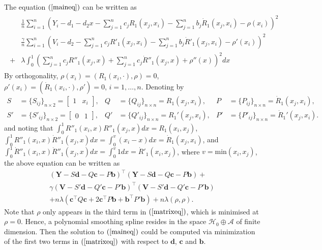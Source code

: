 The equation $(\ref{maineq})$ can be written as
\begin{align*}
\begin{split}
&\frac{1}{n}\sum_{i=1}^n \left( Y_i - d_1-d_2x-\sum_{j=1}^{n}c_jR_1(x_j,x_i)-\sum_{j=1}^{n}b_j\dot{R}_1(x_j,x_i)-\rho(x_i) \right) ^2\\
&\frac{\gamma}{n}\sum_{i=1}^n \left( V_i - d_2-\sum_{j=1}^{n}c_jR'_1(x_j,x_i)-\sum_{j=1}^{n}b_j\dot{R}'_1(x_j,x_i)-\rho'(x_i) \right) ^2\\
+&\lambda \int_0^1 \left( \sum_{j=1}^{n}c_jR''_1(x_j,x)+\sum_{j=1}^{n}c_j\dot{R}''_1(x_j,x)+\rho''(x)\right)^2dx
\end{split}
\end{align*}
By orthogonality, $\rho(x_i) = (R_1(x_i,\cdot),\rho)=0$, $\rho'(x_i) = (\dot{R}_1(x_i,\cdot),\rho')=0$, $i=1,\ldots,n$. Denoting by
\begin{align*}
S&=\{S_{ij} \}_{n\times 2}=\begin{bmatrix}1 & x_i \end{bmatrix} ,& Q&=\{Q_{ij} \}_{n\times n}= R_1(x_j,x_i), & P&=\{P_{ij} \}_{n\times n}= \dot{R}_1(x_j,x_i), \\
S'&=\{S'_{ij} \}_{n\times 2}=\begin{bmatrix} 0 & 1 \end{bmatrix} ,& Q'&=\{Q'_{ij} \}_{n\times n}= R_1'(x_j,x_i), & P'&=\{P'_{ij} \}_{n\times n}= \dot{R}_1'(x_j,x_i). 
\end{align*}
and noting that $\int_0^1R''_1(x_i,x)R''_1(x_j,x)dx=R_1(x_i,x_j)$, $\int_0^1R''_1(x_i,x)\dot{R}''_1(x_j,x)dx=\int_0^{v}(x_i-x)dx=\dot{R}_1(x_j,x_i)$, and $\int_0^1\dot{R}''_1(x_i,x)\dot{R}''_1(x_j,x)dx=\int_0^{v}1dx=\dot{R}'_1(x_i,x_j)$, where $v=\mbox{min}(x_i,x_j)$, the above equation can be written as
\begin{equation}\label{matrixeq}
\begin{split}
(\mathbf{Y}-S\mathbf{d}-Q\mathbf{c}-P\mathbf{b})^\top (\mathbf{Y}-S\mathbf{d}-Q\mathbf{c}-P\mathbf{b})+\\
\gamma(\mathbf{V}-S'\mathbf{d}-Q'\mathbf{c}-P'\mathbf{b})^\top (\mathbf{V}-S'\mathbf{d}-Q'\mathbf{c}-P'\mathbf{b})\\
+n\lambda (\mathbf{c}^\top Q\mathbf{c} + 2\mathbf{c}^\top P\mathbf{b}+ \mathbf{b}^\top P'\mathbf{b})+n\lambda(\rho,\rho).
\end{split}
\end{equation}
Note that $\rho$ only appears in the third term in $(\ref{matrixeq})$, which is minimised at $\rho=0$. Hence, a polynomial smoothing spline resides in the space $\mathcal{H}_0\oplus \mathcal{A}$ of finite dimension. Then the solution to $(\ref{maineq})$ could be computed via minimization of the first two terms in $(\ref{matrixeq})$ with respect to $\mathbf{d}$, $\mathbf{c}$ and $\mathbf{b}$.

